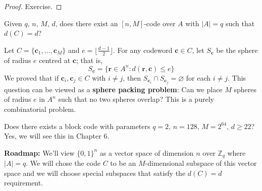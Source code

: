 \begin{proof}
    Exercise.
\end{proof}

Given $ q,\,n,\,M,\,d $, does there exist an $ [n,M] $-code over $ A $
with $ |A|=q $ such that $ d(C)=d $?

Let $ C=\{\bm{c}_1,\ldots ,\bm{c}_M\} $ and $ e=\lfloor \frac{d-1}{2} \rfloor $.
For any codeword $ \bm{c}\in C $, let $ S_{\bm{c}} $ be the sphere of radius $ e $ centred at
$ \bm{c} $;
that is,
\[ S_{\bm{c}}= \{\bm{r}\in A^n:d(\bm{r},\bm{c})\leqslant e\} \]
We proved that if $ \bm{c}_i,\bm{c}_j\in C $ with $ i\neq j $,
then $ S_{\bm{c}_i}\cap S_{\bm{c}_j}= \varnothing $ for each $ i\neq j $.
This question can be viewed as a \textbf{sphere packing problem}:
Can we place $ M $ spheres of radius $ e $ in $ A^n $ such that
no two spheres overlap? This is a purely combinatorial problem.

Does there exists a block code with parameters
$ q=2,\,n=128,\,M=2^{64},\,d\geqslant 22 $? Yes, we will see this in Chapter 6.

\textbf{Roadmap:} We'll view $ \{0,1\}^{n} $ as a vector space of
dimension $ n $ over $ \mathbb{Z}_q $ where $ |A|=q $. We will chose the code
$ C $ to be an $ M $-dimensional subspace of this vector space
and we will choose special subspaces that satisfy the $ d(C)=d $ requirement.
